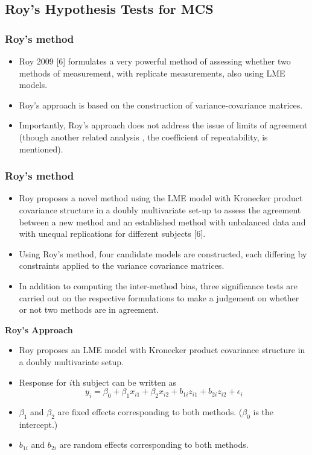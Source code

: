 \documentclass[compress]{beamer}        %
\makeatletter
\newcommand{\tcb}{\textcolor{beamer@blendedblue}}
\makeatother
\begin{document}
\subsection{Roy's Hypothesis Tests for MCS}
\begin{frame}
\frametitle{Roy's method}
\large
\begin{itemize}
\item Roy 2009 [6] formulates a very powerful method of assessing whether two methods of measurement, with replicate measurements, also using LME models.
\item  Roy's approach is based on the construction of variance-covariance matrices.
\item Importantly, Roy's approach does not address the issue of limits of agreement (though another related analysis , the coefficient of repeatability, is mentioned).
\end{itemize}


\end{frame}
\begin{frame}
\frametitle{Roy's method}
\begin{itemize}
\item Roy proposes a novel method using the LME model with Kronecker product covariance structure in a doubly multivariate set-up to assess the agreement between a new method and an established method with unbalanced data and with unequal replications for different subjects [6].
\item 
Using Roy's method, four candidate models are constructed, each differing by constraints applied to the variance covariance matrices.
\item In addition to computing the inter-method bias, three significance tests are carried out on the respective formulations to make a judgement on whether or not two methods are in agreement.
\end{itemize}
\end{frame}


\begin{frame}{\bf \tcb{Roy's Approach}}
\begin{itemize}\itemsep0.4cm
\item Roy proposes an LME model with Kronecker product covariance structure in a doubly multivariate setup.
\item Response for $i$th subject can be written as
\[ y_i = \beta_0 + \beta_1x_{i1} + \beta_2x_{i2} + b_{1i}z_{i1}  + b_{2i}z_{i2} + \epsilon_i \]
\item $\beta_1$ and $\beta_2$ are fixed effects corresponding to both methods. ($\beta_0$ is the intercept.)
\item $b_{1i}$ and $b_{2i}$ are random effects corresponding to both methods.
\end{itemize}
\end{frame}
\end{document}
